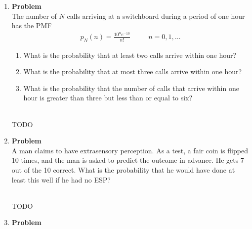 \documentclass[12pt]{article}
\newenvironment{Ex}{\textbf{Problem}\vspace{.75em}\\}{}
\begin{document}
\begin{enumerate}
\begin{Ex}
\begin{solution}
\begin{enumerate}
\begin{equation}
\begin{aligned}
              &= 1.0 \\
              P(0<K<2) &= 2b \\
              &= 0.\overline{333} \\
            \end{aligned}
          \end{equation}
        \end{enumerate}
      \end{solution}
    \end{Ex}
  \item 
    \begin{Ex}
      The number of $N$ calls arriving at a switchboard during a
      period of one hour has the PMF
      \begin{equation*}
        \begin{aligned}
          p_N(n) = \frac{10^ne^{-10}}{n!} \quad && n = 0, 1, \ldots
        \end{aligned}
      \end{equation*}
      \begin{enumerate}
      \item What is the probability that at least two calls arrive
        within one hour?
      \item What is the probability that at most three calls arrive
        within one hour?
      \item What is the probability that the number of calls that
        arrive within one hour is greater than three but less than or
        equal to six?
      \end{enumerate}
      \begin{solution} \hfill \\
        {\huge TODO}
      \end{solution}
    \end{Ex}
  \item 
    \begin{Ex}
      A man claims to have extrasensory perception. As a test, a fair
      coin is flipped 10 times, and the man is asked to predict the
      outcome in advance. He gets 7 out of the 10 correct. What is the
      probability that he would have done at least this well if he had
      no ESP?
      \begin{solution} \hfill \\
        {\huge TODO}
      \end{solution}
    \end{Ex}
  \item 
    \begin{Ex}

\end{Ex}
\end{enumerate}
\end{document}
